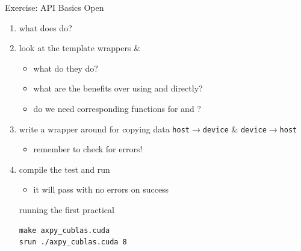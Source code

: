 \begin{frame}[fragile]{Exercise: API Basics}
    Open 
    \begin{enumerate}
        \item what does  do?
        \item look at the template wrappers  \& 
        \begin{itemize}
            \item what do they do?
            \item what are the benefits over using  and  directly?
            \item do we need corresponding functions for  and ?
        \end{itemize}

        \item write a wrapper around  for copying data \texttt{host$\rightarrow$device} \& \texttt{device$\rightarrow$host}
        \begin{itemize}
            \item remember to check for errors!
        \end{itemize}

        \item compile the test and run
        \begin{itemize}
            \item it will pass with no errors on success
        \end{itemize}

    \vspace{-5pt}
\begin{code}{running the first practical}
\begin{lstlisting}[]
make axpy_cublas.cuda
srun ./axpy_cublas.cuda 8
\end{lstlisting}
\end{code}
    \end{enumerate}

\end{frame}

